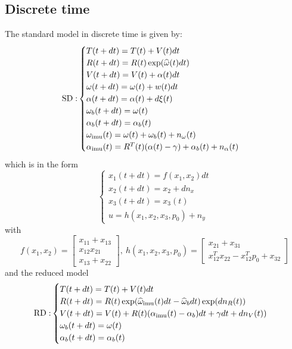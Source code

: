 \documentclass[]{article}
\newcommand{\ba}{\left[ \begin{array}}
\newcommand{\ea}{\end{array} \right]}
\def\w{\omega}
\def\imu{_\mathrm{imu}}
\begin{document}
{\subsection{Discrete time}
%
The standard model in discrete time is given by:
\begin{equation}
{\rm SD:}
\begin{cases}
T(t+dt) = T(t) + V(t)dt \\
R(t+dt) = R(t)\exp(\widehat \w(t)dt) \\
V(t+dt) = V(t) + \alpha(t)dt \\
\w(t+dt) = \w(t) + w(t) dt \\
\alpha(t+dt) = \alpha(t) + d\xi(t)\\
\w_b(t+dt) = \w(t) \\
\alpha_b(t+dt) = \alpha_b(t) \\
\w\imu (t) = \w(t) + \w_b(t) + n_\w(t) \\
\alpha\imu (t) = R^T(t) (\alpha(t) - \gamma) + \alpha_b(t) + n_\alpha(t) 
\end{cases}
\end{equation}
which is in the form
\begin{equation}
\begin{cases}
x_1(t+dt) = f(x_1,x_2)dt \\
x_2(t+dt) = x_2 + dn_x \\
x_3(t+dt)= x_3(t) \\
u = h(x_1, x_2, x_3, p_0) + n_y
\end{cases}
\end{equation}
with 
\begin{equation}
f(x_1, x_2) = \ba{c}x_{11}+x_{13} \\ x_{12}x_{21} \\ x_{13}+x_{22} \ea, 
\ h(x_1, x_2, x_3, p_0) = \ba{c} x_{21} + x_{31} \\
x_{12}^T x_{22} - x_{12}^Tp_0 + x_{32} \ea
\end{equation}
and the reduced model
\begin{equation}
{\rm RD:}
\begin{cases}
T(t+dt) = T(t) + V(t)dt \\
R(t+dt) = R(t)\exp(\widehat \w\imu (t)dt - \widehat \w_b dt)\exp(dn_R(t)) \\
V(t+dt) = V(t) + R(t)(\alpha\imu (t) - \alpha_b)dt + \gamma dt + dn_V(t)) \\
\w_b(t+dt) = \w(t) \\
\alpha_b(t+dt) = \alpha_b(t)
\end{cases}
\end{equation}
}
\end{document}
